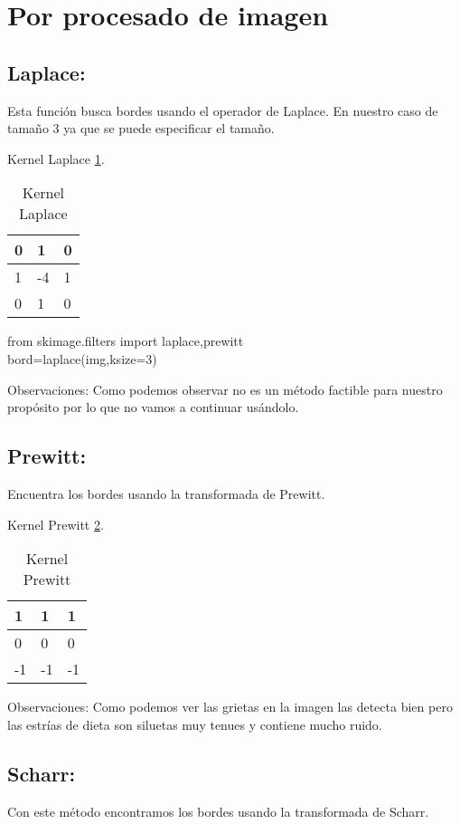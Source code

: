 
\section{Por procesado de imagen}
\subsection{Laplace:}
Esta función busca bordes usando el operador de Laplace. En nuestro caso de tamaño 3 ya que se puede especificar el tamaño.

Kernel Laplace \ref{F_k1}.
\begin{table}[]
	\centering
	\caption{Kernel Laplace}
	\label{F_k1}
	\begin{tabular}{|l|l|l|}
		\hline
		0 & 1  & 0 \\ \hline
		1 & -4 & 1 \\ \hline
		0 & 1  & 0 \\ \hline
	\end{tabular}
\end{table}

from skimage.filters import laplace,prewitt\\
bord=laplace(img,ksize=3)

Observaciones:
Como podemos observar no es un método factible para nuestro propósito por lo que no vamos a continuar usándolo.

\subsection{Prewitt:}

Encuentra los bordes usando la transformada de Prewitt.

Kernel Prewitt \ref{F_k2}.
\begin{table}[]
	\centering
	\caption{Kernel Prewitt}
	\label{F_k2}
	\begin{tabular}{|l|l|l|}
		\hline
		1  & 1   & 1 \\ \hline
		0  & 0   & 0 \\ \hline
		-1 & -1  & -1 \\ \hline
	\end{tabular}
\end{table}



Observaciones:
Como podemos ver las grietas en la imagen las detecta bien pero las estrías de dieta son siluetas muy tenues y contiene mucho ruido.


\subsection{Scharr:}
Con este método encontramos los bordes usando la transformada de Scharr.

